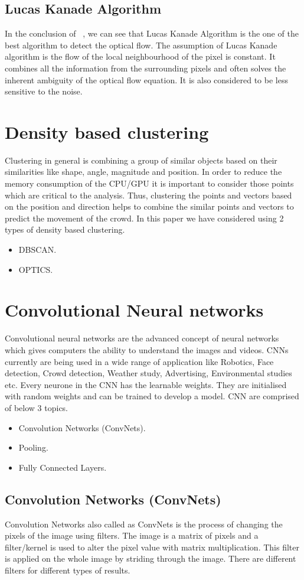 \subsection{Lucas Kanade Algorithm}
In the conclusion of ~\cite{galvin1998recovering}, we can see that Lucas Kanade Algorithm is the one of the best algorithm to detect the optical flow. The assumption of Lucas Kanade algorithm is the flow of the local neighbourhood of the pixel is constant. It combines all the information from the surrounding pixels and often solves the inherent ambiguity of the optical flow equation. It is also considered to be less sensitive to the noise.
\section{Density based clustering}
Clustering in general is combining a group of similar objects based on their similarities like shape, angle, magnitude and position. In order to reduce the memory consumption of the CPU/GPU it is important to consider those points which are critical to the analysis. Thus, clustering the points and vectors based on the position and direction helps to combine the similar points and vectors to predict the movement of the crowd. In this paper we have considered using 2 types of density based clustering.
\begin{itemize}
	\item DBSCAN.
	\item OPTICS.
\end{itemize}
\section{Convolutional Neural networks}
Convolutional neural networks are the advanced concept of neural networks which gives computers the ability to understand the images and videos. CNNs currently are being used in a wide range of application like Robotics, Face detection, Crowd detection, Weather study, Advertising, Environmental studies etc. Every neurone in the CNN has the learnable weights. They are initialised with random weights and can be trained to develop a model. CNN are comprised of below 3 topics.
\begin{itemize}
	\item Convolution Networks (ConvNets).
	\item Pooling.
	\item Fully Connected Layers.
\end{itemize}
\subsection{Convolution Networks (ConvNets)}
Convolution Networks also called as ConvNets is the process of changing the pixels of the image using filters. The image is a matrix of pixels and a filter/kernel is used to alter the pixel value with matrix multiplication. This filter is applied on the whole image by striding through the image. There are different filters for different types of results. 
